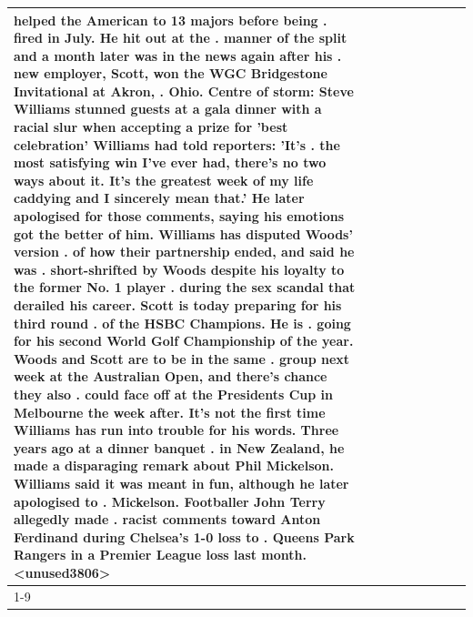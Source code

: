 \begin{table}[H]
\begin{tabular}{lllrlllll}
helped the American to 13 majors before being . fired in July. He hit out at the . manner of the split and a month later was in the news again after his . new employer, Scott, won the WGC Bridgestone Invitational at Akron, . Ohio. Centre of storm: Steve Williams stunned guests at a gala dinner with a racial slur when accepting a prize for 'best celebration' Williams had told reporters: 'It's . the most satisfying win I've ever had, there's no two ways about it. It's the greatest week of my life caddying and I sincerely mean that.' He later apologised for those comments, saying his emotions got the better of him. Williams has disputed Woods' version . of how their partnership ended, and said he was . short-shrifted by Woods despite his loyalty to the former No. 1 player . during the sex scandal that derailed his career. Scott is today preparing for his third round . of the HSBC Champions. He is . going for his second World Golf Championship of the year. Woods and Scott are to be in the same . group next week at the Australian Open, and there's chance they also . could face off at the Presidents Cup in Melbourne the week after. It's not the first time Williams has run into trouble for his words. Three years ago at a dinner banquet . in New Zealand, he made a disparaging remark about Phil Mickelson. Williams said it was meant in fun, although he later apologised to . Mickelson. Footballer John Terry allegedly made . racist comments toward Anton Ferdinand during Chelsea's 1-0 loss to . Queens Park Rangers in a Premier League loss last month.<unused3806> \\
\cline{1-9}

\end{tabular}
\end{table}
